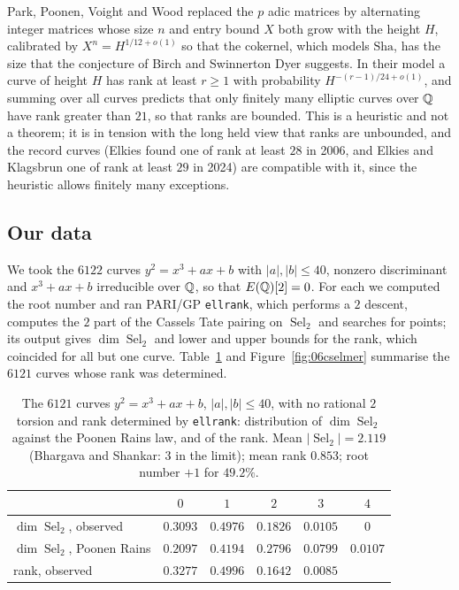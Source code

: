 Park, Poonen, Voight and Wood \cite{ppvw2019} replaced the $p$ adic matrices by alternating integer matrices whose size $n$ and entry bound $X$ both grow with the height $H$, calibrated by $X^n = H^{1/12+o(1)}$ so that the cokernel, which models $\mathrm{Sha}$, has the size that the conjecture of Birch and Swinnerton Dyer suggests. In their model a curve of height $H$ has rank at least $r\ge1$ with probability $H^{-(r-1)/24+o(1)}$, and summing over all curves predicts that only finitely many elliptic curves over $\mathbb{Q}$ have rank greater than $21$, so that ranks are bounded. This is a heuristic and not a theorem; it is in tension with the long held view that ranks are unbounded, and the record curves (Elkies found one of rank at least $28$ in 2006, and Elkies and Klagsbrun one of rank at least $29$ in 2024) are compatible with it, since the heuristic allows finitely many exceptions.

\subsection{Our data}

We took the $6122$ curves $y^2 = x^3+ax+b$ with $|a|,|b|\le40$, nonzero discriminant and $x^3+ax+b$ irreducible over $\mathbb{Q}$, so that $E(\mathbb{Q})[2] = 0$. For each we computed the root number and ran PARI/GP \texttt{ellrank}, which performs a $2$ descent, computes the $2$ part of the Cassels Tate pairing on $\operatorname{Sel}_2$ and searches for points; its output gives $\dim\operatorname{Sel}_2$ and lower and upper bounds for the rank, which coincided for all but one curve. Table~\ref{tab:06cselmer} and Figure~\ref{fig:06cselmer} summarise the $6121$ curves whose rank was determined.

\begin{table}[ht]\centering\small
\begin{tabular}{lccccc}
\toprule
 & $0$ & $1$ & $2$ & $3$ & $4$\\
\midrule
$\dim\operatorname{Sel}_2$, observed & $0.3093$ & $0.4976$ & $0.1826$ & $0.0105$ & $0$\\
$\dim\operatorname{Sel}_2$, Poonen Rains & $0.2097$ & $0.4194$ & $0.2796$ & $0.0799$ & $0.0107$\\
rank, observed & $0.3277$ & $0.4996$ & $0.1642$ & $0.0085$ & \\
\bottomrule
\end{tabular}
\caption{The $6121$ curves $y^2 = x^3+ax+b$, $|a|,|b|\le40$, with no rational $2$ torsion and rank determined by \texttt{ellrank}: distribution of $\dim\operatorname{Sel}_2$ against the Poonen Rains law, and of the rank. Mean $|\operatorname{Sel}_2| = 2.119$ (Bhargava and Shankar: $3$ in the limit); mean rank $0.853$; root number $+1$ for $49.2\%$.}\label{tab:06cselmer}
\end{table}

